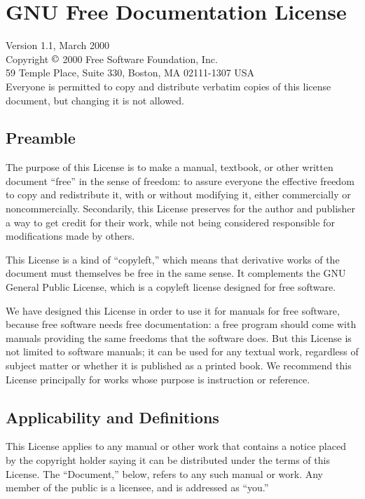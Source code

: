 
\chapter{GNU Free Documentation License}

Version 1.1, March 2000\\

Copyright $\copyright$ 2000 Free Software Foundation, Inc.\\
 59 Temple Place, Suite 330, Boston, MA 02111-1307 USA\\
 Everyone is permitted to copy and distribute verbatim copies of this
license document, but changing it is not allowed.

\section*{Preamble}

The purpose of this License is to make a manual, textbook, or other
written document ``free'' in the sense of freedom: to assure everyone
the effective freedom to copy and redistribute it, with or without
modifying it, either commercially or noncommercially. Secondarily,
this License preserves for the author and publisher a way to get credit
for their work, while not being considered responsible for modifications
made by others.

This License is a kind of ``copyleft,'' which means that derivative
works of the document must themselves be free in the same sense. It
complements the GNU General Public License, which is a copyleft license
designed for free software.

We have designed this License in order to use it for manuals for free
software, because free software needs free documentation: a free program
should come with manuals providing the same freedoms that the software
does. But this License is not limited to software manuals; it can
be used for any textual work, regardless of subject matter or whether
it is published as a printed book. We recommend this License principally
for works whose purpose is instruction or reference.

\section{Applicability and Definitions}

This License applies to any manual or other work that contains a notice
placed by the copyright holder saying it can be distributed under
the terms of this License. The ``Document,'' below, refers to any
such manual or work. Any member of the public is a licensee, and is
addressed as ``you.''

